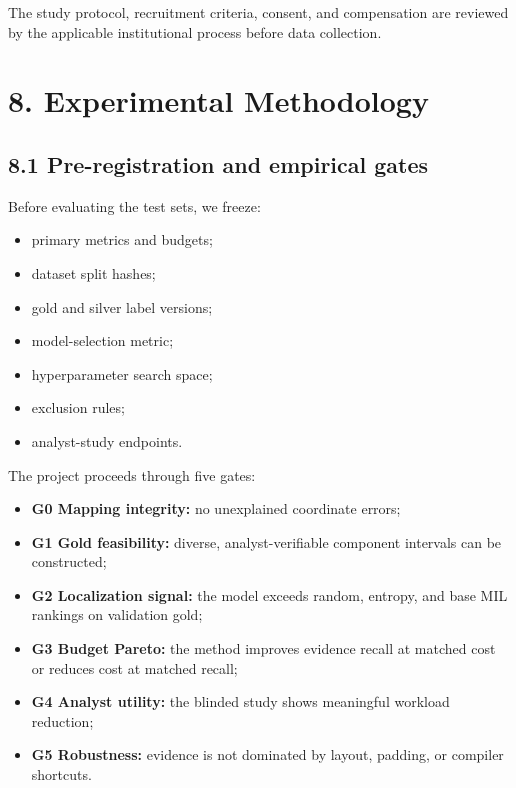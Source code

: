 \documentclass[
  10pt,
]{article}
\providecommand{\tightlist}{%
  \setlength{\itemsep}{0pt}\setlength{\parskip}{0pt}}
\begin{document}
The study protocol, recruitment criteria, consent, and compensation are
reviewed by the applicable institutional process before data collection.

\section{8. Experimental Methodology}\label{experimental-methodology}

\subsection{8.1 Pre-registration and empirical
gates}\label{pre-registration-and-empirical-gates}

Before evaluating the test sets, we freeze:

\begin{itemize}
\tightlist
\item
  primary metrics and budgets;
\item
  dataset split hashes;
\item
  gold and silver label versions;
\item
  model-selection metric;
\item
  hyperparameter search space;
\item
  exclusion rules;
\item
  analyst-study endpoints.
\end{itemize}

The project proceeds through five gates:

\begin{itemize}
\tightlist
\item
  \textbf{G0 Mapping integrity:} no unexplained coordinate errors;
\item
  \textbf{G1 Gold feasibility:} diverse, analyst-verifiable component
  intervals can be constructed;
\item
  \textbf{G2 Localization signal:} the model exceeds random, entropy,
  and base MIL rankings on validation gold;
\item
  \textbf{G3 Budget Pareto:} the method improves evidence recall at
  matched cost or reduces cost at matched recall;
\item
  \textbf{G4 Analyst utility:} the blinded study shows meaningful
  workload reduction;
\item
  \textbf{G5 Robustness:} evidence is not dominated by layout, padding,
  or compiler shortcuts.
\end{itemize}
\end{document}
